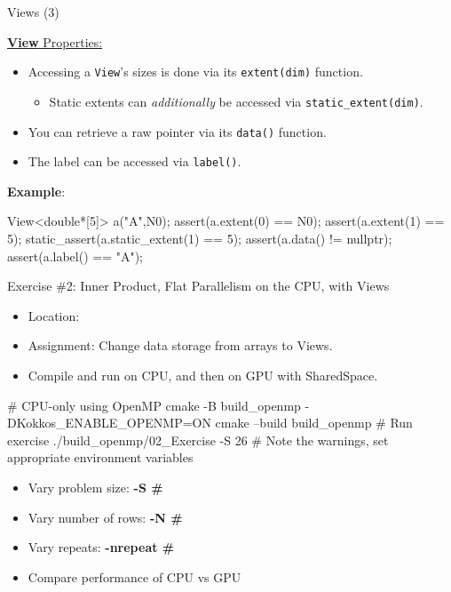 \begin{frame}[fragile]{Views (3)}

  \ul{\textbf{View} Properties:}

  \begin{itemize}
    \item Accessing a \texttt{View}'s sizes is done via its \texttt{extent(dim)} function.
         \begin{itemize}
		 \item Static extents can \emph{additionally} be accessed via \texttt{static\_extent(dim)}.
	 \end{itemize}
    \item You can retrieve a raw pointer via its \texttt{data()} function.
    \item The label can be accessed via \texttt{label()}.
  \end{itemize}

  \textbf{Example}:

  \begin{code}[keywords={View,extent,static_extent,data,label}]
	  View<double*[5]> a("A",N0);
	  assert(a.extent(0) == N0);
	  assert(a.extent(1) == 5);
	  static_assert(a.static_extent(1) == 5);
	  assert(a.data() != nullptr);
	  assert(a.label() == "A");
  \end{code}

\end{frame}

\begin{frame}[fragile]{Exercise \#2: Inner Product, Flat Parallelism on the CPU, with Views}

  \begin{small}
  \begin{itemize}
  \item Location: 
  \item Assignment: Change data storage from arrays to Views.
  \item Compile and run on CPU, and then on GPU with SharedSpace.
  \end{itemize}
  \end{small}

\begin{code}
# CPU-only using OpenMP
cmake -B build_openmp -DKokkos_ENABLE_OPENMP=ON
cmake --build build_openmp
# Run exercise
./build_openmp/02_Exercise -S 26
# Note the warnings, set appropriate environment variables
\end{code}

  \begin{scriptsize}
  \begin{itemize}
  \item Vary problem size: \textbf{-S \#}
  \item Vary number of rows: \textbf{-N \#}
  \item Vary repeats: \textbf{-nrepeat \#}
  \item Compare performance of CPU vs GPU
  \end{itemize}
  \end{scriptsize}

\end{frame}

